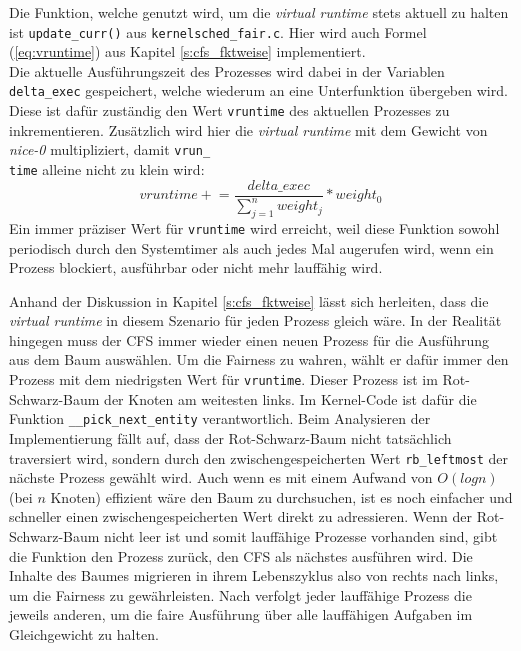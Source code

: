 Die Funktion, welche genutzt wird, um die \textit{virtual \- runtime} stets aktuell zu halten ist \texttt{update\_curr()} aus \texttt{kernel\-\/sched\_fair.c}. Hier wird auch Formel (\ref{eq:vruntime}) aus Kapitel \ref{s:cfs_fktweise} implementiert.\\
 Die aktuelle Aus\-füh\-rungs\-zeit des Prozesses wird dabei in der Variablen \texttt{delta\_exec} gespeichert, welche wiederum an eine Unterfunktion über\-geben wird. Diese ist dafür zuständig den Wert \texttt{vruntime} des aktuellen Prozesses zu inkrementieren. Zusätzlich wird hier die \textit{virtual runtime} mit dem Gewicht von \textit{nice-0} multipliziert, damit \texttt{vrun\_\\time} alleine nicht zu klein wird:
\begin{equation}
vruntime \mathrel{+}= \frac{delta\_exec}{\sum_{j=1}^{n} weight_j} * weight_{0} 
\label{eq:vrt_inc}
\end{equation}
Ein immer präziser Wert für \texttt{vruntime} wird erreicht, weil diese Funktion sowohl periodisch durch den Systemtimer als auch jedes Mal augerufen wird, wenn ein Prozess blockiert, aus\-führbar oder nicht mehr lauffähig wird.

Anhand der Diskussion in Kapitel \ref{s:cfs_fktweise} lässt sich herleiten, dass die \textit{virtual runtime} in diesem Szenario für jeden Prozess gleich wäre. In der Realität hingegen muss der CFS immer wieder einen neuen Prozess für die Ausführung aus dem Baum auswählen. Um die Fairness zu wahren, wählt er dafür immer den Prozess mit dem niedrigsten Wert für \texttt{vruntime}. Dieser Prozess ist im Rot-Schwarz-Baum der Knoten am weitesten links. Im Kernel-Code ist dafür die Funktion \texttt{\_\_pick\_next\_entity} verantwortlich. Beim \- Analysieren der Implementierung fällt auf, dass der Rot-Schwarz-Baum nicht tatsächlich traversiert wird, sondern durch den zwischengespeicherten Wert \texttt{rb\_leftmost} der nächste Prozess gewählt wird. Auch wenn es mit einem Aufwand von $O(log n)$ (bei $n$ Knoten) effizient wäre den Baum zu durchsuchen, ist es noch einfacher und schneller einen zwischengespeicherten Wert direkt zu adressieren. Wenn der Rot-Schwarz-Baum nicht leer ist und somit lauffähige Prozesse vorhanden sind, gibt die Funktion den Prozess zurück, den CFS als nächstes ausführen wird. Die Inhalte des Baumes migrieren in ihrem Lebenszyklus also von rechts nach links, um die Fairness zu gewährleisten. Nach \cite{mjones} verfolgt jeder lauffähige Prozess die jeweils anderen, um die faire Ausführung über alle lauffähigen Aufgaben im Gleichgewicht zu halten.

